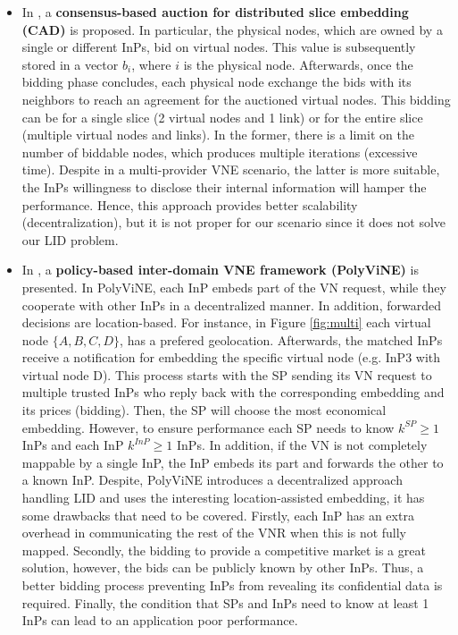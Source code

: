 \begin{itemize}
	\item In \citep{esposito2013general}, a \textbf{consensus-based auction for distributed slice embedding (CAD)} is proposed. In particular, the physical nodes, which are owned by a single or different InPs, bid on virtual nodes. This value is subsequently stored in a vector $b_i$, where $i$ is the physical node. Afterwards, once the bidding phase concludes, each physical node exchange the bids with its neighbors to reach an agreement for the auctioned virtual nodes. This bidding can be for a single slice (2 virtual nodes and 1 link) or for the entire slice (multiple virtual nodes and links). In the former, there is a limit on the number of biddable nodes, which produces multiple iterations (excessive time). Despite in a multi-provider VNE scenario, the latter is more suitable, the InPs willingness to disclose their internal information will hamper the performance. Hence, this approach provides better scalability (decentralization), but it is not proper for our scenario since it does not solve our LID problem.
	\item In \citep{chowdhury2010polyvine}, a \textbf{policy-based inter-domain VNE framework (PolyViNE)} is presented. In PolyViNE, each InP embeds part of the VN request, while they cooperate with other InPs in a decentralized manner. In addition, forwarded decisions are location-based. For instance, in Figure \ref{fig:multi} each virtual node $\{A,B,C,D\}$, has a prefered geolocation. Afterwards, the matched InPs receive a notification for embedding the specific virtual node (e.g. InP3 with virtual node D). This process starts with the SP sending its VN request to multiple trusted InPs who reply back with the corresponding embedding and its prices (bidding). Then, the SP will choose the most economical embedding. However, to ensure performance each SP needs to know $k^{SP} \geq 1$ InPs and each InP $k^{InP} \geq 1$ InPs. In addition, if the VN is not completely mappable by a single InP, the InP embeds its part and forwards the other to a known InP. Despite, PolyViNE introduces a decentralized approach handling LID and uses the interesting location-assisted embedding, it has some drawbacks that need to be covered. Firstly, each InP has an extra overhead in communicating the rest of the VNR when this is not fully mapped. Secondly, the bidding to provide a competitive market is a great solution, however, the bids can be publicly known by other InPs. Thus, a better bidding process preventing InPs from revealing its confidential data is required. Finally, the condition that SPs and InPs need to know at least 1 InPs can lead to an application poor performance.
	

\end{itemize}
